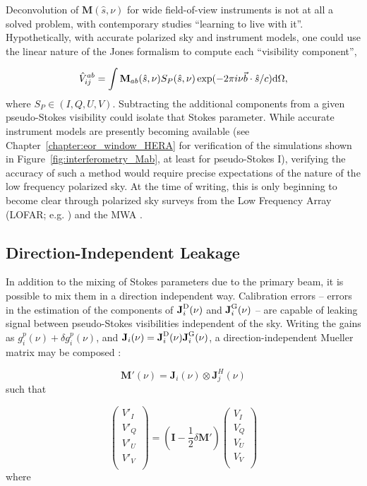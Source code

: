 Deconvolution of $\textbf{M}(\hat{s},\nu)$ for wide field-of-view instruments is not at all a solved problem, with contemporary studies ``learning to live with it''. Hypothetically, with accurate polarized sky and instrument models, one could use the linear nature of the Jones formalism to compute each ``visibility component'',

\begin{equation}
\hat{V}^{ab}_{ij} = \int \textbf{M}_{ab}(\hat{s},\nu)S_P(\hat{s},\nu)\exp(-2\pi i \nu \vec{b}\cdot\hat{s}/c) {\rm d}\Omega,
\end{equation}
where $S_P \in (I, Q, U, V)$. Subtracting the additional components from a given pseudo-Stokes visibility could isolate that Stokes parameter. While accurate instrument models are presently becoming available (see Chapter~\ref{chapter:eor_window_HERA} for verification of the simulations shown in Figure~\ref{fig:interferometry_Mab}, at least for pseudo-Stokes I), verifying the accuracy of such a method would require precise expectations of the nature of the low frequency polarized sky. At the time of writing, this is only beginning to become clear through polarized sky surveys from the Low Frequency Array (LOFAR; e.g. \citet{VanEck.18}) and the MWA \citep[e.g.][]{Lenc.16, Lenc.17}.

\subsection{Direction-Independent Leakage}

In addition to the mixing of Stokes parameters due to the primary beam, it is possible to mix them in a direction independent way. Calibration errors -- errors in the estimation of the components of $\textbf{J}_i^{\rm D}(\nu)$ and $\textbf{J}_i^{\rm G}(\nu)$ -- are capable of leaking signal between pseudo-Stokes visibilities independent of the sky. Writing the gains as $g_i^p(\nu) + \delta g_i^p(\nu)$, and $\textbf{J}_i (\nu)=\textbf{J}_i^{\rm D}(\nu)\textbf{J}_i^{\rm G}(\nu)$,  a direction-independent Mueller matrix may be composed \citep{TMS}:

\begin{equation}
\textbf{M}'(\nu) = \textbf{J}_i (\nu) \otimes \textbf{J}_j^H (\nu)
\end{equation}
such that

\begin{equation}
\begin{pmatrix}
V'_I \\
V'_Q \\
V'_U \\
V'_V \\
\end{pmatrix}
=
(\textbf{I} - \frac{1}{2}\delta\textbf{M}')
\begin{pmatrix}
V_I \\
V_Q \\
V_U \\
V_V \\
\end{pmatrix}
\end{equation}
where

